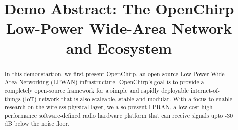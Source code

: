 \documentclass[conference]{IEEEtran}
\begin{document}
\title{Demo Abstract: The OpenChirp Low-Power Wide-Area Network and Ecosystem}
\author{
}


% 








\maketitle

\begin{abstract}

In this demonstartion, we first present OpenChirp, an open-source Low-Power
Wide Area Networking (LPWAN) infrastructure. OpenChirp's goal is to provide a
completely open-source framework for a simple and rapidly deployable
internet-of-things (IoT) network that is also scaleable, stable and modular.
With a focus to enable research on the wireless physical layer, we also
present LPRAN, a low-cost high-performance software-defined radio hardware
platform that can receive signals upto -30 dB below the noise floor.

\end{abstract}
\end{document}
